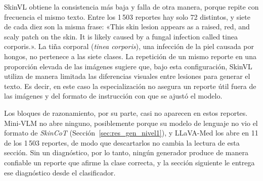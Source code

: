 SkinVL obtiene la consistencia más baja y falla de otra manera, porque repite con frecuencia el mismo texto. Entre los
1\,503 reportes hay solo 72 distintos, y siete de cada diez son la misma frase: «This skin lesion appears as a raised,
red, and scaly patch on the skin. It is likely caused by a fungal infection called tinea corporis.». La tiña corporal
(\emph{tinea corporis}), una infección de la piel causada por hongos, no pertenece a las siete clases. La repetición de un mismo reporte en una proporción elevada de las imágenes sugiere que, bajo esta configuración, SkinVL utiliza de manera limitada las diferencias visuales entre lesiones para generar el texto. Es decir, en este caso la especialización no asegura un
reporte útil fuera de las imágenes y del formato de instrucción con que se ajustó el modelo.

Los bloques de razonamiento, por su parte, casi no aparecen en estos reportes. Mini-VLM no abre ninguno, posiblemente
porque su modelo de lenguaje no vio el formato de \emph{SkinCoT} (Sección~\ref{sec:res_gen_nivel1}), y LLaVA-Med los
abre en 11 de los 1\,503 reportes, de modo que descartarlos no cambia la lectura de esta sección. Sin un diagnóstico,
por lo tanto, ningún generador produce de manera confiable un reporte que afirme la clase correcta, y la sección
siguiente le entrega ese diagnóstico desde el clasificador.
